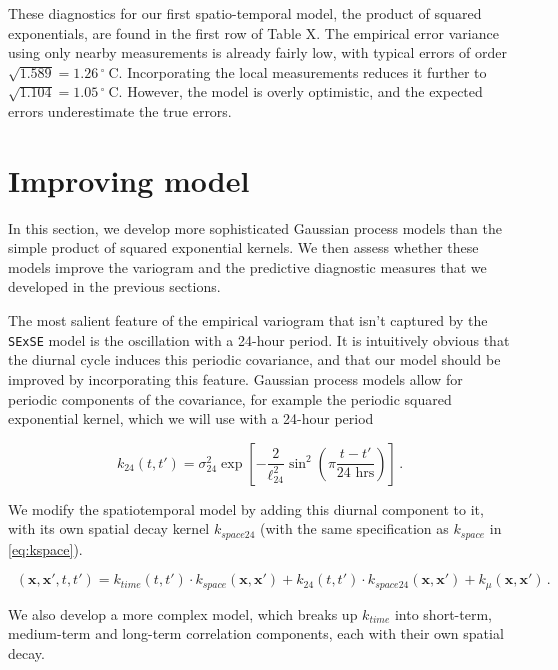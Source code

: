 \documentclass[letter]{article}
\newcommand{\genericdel}[3]{%
      \left#1#3\right#2
    }
\newcommand{\del}[1]{\genericdel(){#1}}
\newcommand{\sbr}[1]{\genericdel[]{#1}}
\newcommand{\xvec}{\mathbold{x}}
\newcommand{\degreeC}{{}^{\circ}~\mathrm{C}}
\DeclareMathOperator{\kdiurn}{k_{\mathtt{SESE_24}}}
\begin{document}
These diagnostics for our first spatio-temporal model, the product of squared exponentials, are found in the first row of Table X. The empirical error variance using only nearby measurements is already fairly low, with typical errors of order \(\sqrt{1.589}=1.26\,\degreeC\). Incorporating the local measurements reduces it further to \(\sqrt{1.104}=1.05\,\degreeC\). However, the model is overly optimistic, and the expected errors underestimate the true errors.
    


        \section{Improving model}\label{improving-model}
    

\label{sec:improving_model}
        In this section, we develop more sophisticated Gaussian process models than the simple product of squared exponential kernels. We then assess whether these models improve the variogram and the predictive diagnostic measures that we developed in the previous sections.

The most salient feature of the empirical variogram that isn't captured by the \texttt{SExSE} model is the oscillation with a 24-hour period. It is intuitively obvious that the diurnal cycle induces this periodic covariance, and that our model should be improved by incorporating this feature. Gaussian process models allow for periodic components of the covariance, for example the periodic squared exponential kernel, which we will use with a 24-hour period

\begin{equation}
    k_{24}(t,t') = \sigma_{24}^2 \exp\sbr{ - \frac{2}{\ell_{24}^2} \sin^2\del{
        \pi \frac{t-t'}{\text{24 hrs}} 
        }}\,.
\end{equation}

We modify the spatiotemporal model by adding this diurnal component to it, with its own spatial decay kernel \(k_{space24}\) (with the same specification as \(k_{space}\) in \eqref{eq:kspace}).

\begin{equation}
    \kdiurn(\xvec,\xvec',t,t') = k_{time}(t,t') \cdot k_{space}(\xvec, \xvec') 
        + k_{24}(t,t') \cdot k_{space24}(\xvec, \xvec')
        + k_\mu(\xvec, \xvec') 
        \,.
\end{equation}
    


        We also develop a more complex model, which breaks up \(k_{time}\) into short-term, medium-term and long-term correlation components, each with their own spatial decay.
\end{document}
